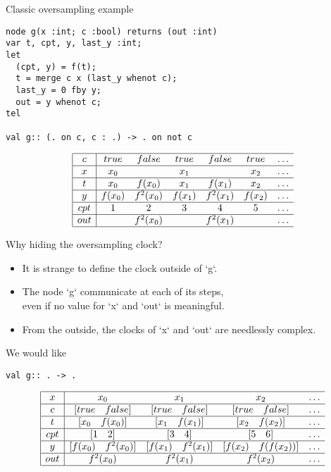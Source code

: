 \documentclass[xcolor=dvipsnames]{beamer}
\def\li{\\ \hline}
\begin{document}
\begin{frame}[fragile]{Classic oversampling example}
\begin{lstlisting}
node g(x :int; c :bool) returns (out :int)
var t, cpt, y, last_y :int;
let
  (cpt, y) = f(t);
  t = merge c x (last_y whenot c);
  last_y = 0 fby y;
  out = y whenot c;
tel

val g:: (. on c, c : .) -> . on not c
\end{lstlisting}

\[
\begin{array}{|c|cccccccc} \hline
c & true & false & true & false & true & \ldots\li
x & x_0 & & x_1 & & x_2 &\ldots\li
t & x_0 & f(x_0) & x_1 & f(x_1) & x_2 &\ldots\li
y & f(x_0) & f^2(x_0) & f(x_1) & f^2(x_1) & f(x_2) &\ldots\li
cpt & 1 & 2 & 3 & 4 & 5 &\ldots\li
out & & f^2(x_0) & & f^2(x_1) & &\ldots \li
\end{array}
\]
\end{frame}

\begin{frame}[fragile]{Why hiding the oversampling clock?}
\begin{block}{}
\begin{itemize}
  \item It is strange to define the clock outside of `g`.
  \item The node `g` communicate at each of its steps,\\
    even if no value for `x` and `out` is meaningful.
  \item From the outside, the clocks of `x` and `out` are needlessly complex.
\end{itemize}
\end{block}
\begin{block}{We would like}
\begin{lstlisting}
val g:: . -> .
\end{lstlisting}
\[
\begin{array}{|c|cccccccc} \hline
x & x_0 & x_1 & x_2 &\ldots\li
c & [true\quad false] & [true\quad false] & [true\quad false]& \ldots\li
t & [x_0\quad f(x_0)] & [x_1\quad f(x_1)] & [x_2\quad f(x_2)] &\ldots\li
cpt & [1 \quad 2] & [3 \quad 4] & [5 \quad 6] &\ldots\li
y & [f(x_0)\quad f^2(x_0)] & [f(x_1)\quad f^2(x_1)] & [f(x_2)\quad f(f(x_2))] &\ldots\li
out & f^2(x_0) & f^2(x_1) &f^2(x_2) &\ldots \li
\end{array}
\]
\end{block}
\end{frame}
\end{document}
